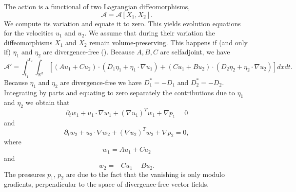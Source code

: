 \documentclass[11pt,reqno]{amsproc}
\newcommand{\pa}{\partial}
\newcommand{\la}{\label}
\newcommand{\na}{\nabla}
\newcommand{\be}{\begin{equation}}
\newcommand{\ee}{\end{equation}}
\newcommand{\R}{\mathbb{R}}
\begin{document}
The action is a functional of two Lagrangian diffeomorphisms,
\be
\mathcal A = \mathcal A[X_1, X_2].
\la{mathcalalax}
\ee
We compute its variation and equate it to zero. This yields evolution equations for the velocities $u_1$ and $u_2$. We assume that
during their variation the diffeomorphisms $X_1$ and $X_2$ remain volume-preserving. This happens if (and only if) $\eta_1$ and $\eta_2$ are divergence-free (\cite{hydro}). Because $A, B, C$ are selfadjoint, we have
\be
\mathcal A' = \int_{t_1}^{t_2}\int_{\R^d}\left[(Au_1+ Cu_2)\cdot(D_1\eta_1 + \eta_1\cdot\na u_1) +
(Cu_1 + Bu_2)\cdot(D_2\eta_2 + \eta_2\cdot\na u_2)\right]dxdt.
\la{mathcalAprime}
\ee
Because $\eta_1$ and $\eta_2$ are divergence-free we have $D_1^* = -D_1$ and $D_2^* = -D_2$. Integrating by parts and equating to zero separately the contributions due to $\eta_1$ and $\eta_2$ we obtain that
\be
\pa_t w_1 + u_1\cdot\na w_1 + (\na u_1)^Tw_1 + \na p_1 = 0
\la{w1eq}
\ee
and 
\be
\pa_t w_2 + u_2\cdot\na w_2 + (\na u_2)^Tw_2 + \na p_2 = 0,
\la{w2eq}
\ee
where
\be
w_1 = Au_1 + Cu_2
\la{w1}
\ee
and
\be
w_2 = - Cu_1 - Bu_2.
\la{w2}
\ee
The pressures $p_1$, $p_2$ are due to the fact that the vanishing is only modulo gradients,  perpendicular to the space of divergence-free vector fields.
\end{document}
